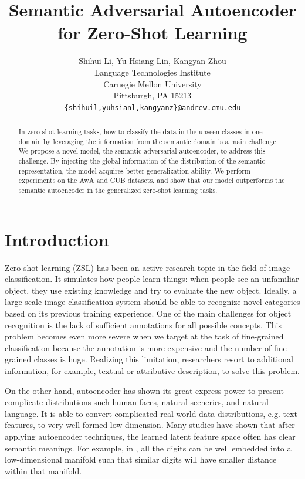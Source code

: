\documentclass{article}
\title{Semantic Adversarial Autoencoder for Zero-Shot Learning}
\author{
	Shihui Li, Yu-Hsiang Lin, Kangyan Zhou
		\\
	Language Technologies Institute\\
	Carnegie Mellon University\\
	Pittsburgh, PA 15213 \\
	\texttt{\{shihuil,yuhsianl,kangyanz\}@andrew.cmu.edu} \\
}
\begin{document}
\maketitle

\begin{abstract}

In zero-shot learning tasks, how to classify the data in the unseen classes in one domain by leveraging the information from the semantic domain is a main challenge. We propose a novel model, the semantic adversarial autoencoder, to address this challenge. By injecting the global information of the distribution of the semantic representation, the model acquires better generalization ability. We perform experiments on the AwA and CUB datasets, and show that our model outperforms the semantic autoencoder in the generalized zero-shot learning tasks.

\end{abstract}


\section{Introduction}

Zero-shot learning (ZSL) has been an active research topic in the field of image classification. It simulates how people learn things: when people see an unfamiliar object, they use existing knowledge and try to evaluate the new object. Ideally, a large-scale image classification system should be able to recognize novel categories based on its previous training experience. One of the main challenges for object recognition is the lack of sufficient annotations for all possible concepts. This problem becomes even more severe when we target at the task of fine-grained classification because the annotation is more expensive and the number of fine-grained classes is huge. Realizing this limitation, researchers resort to additional information, for example, textual or attributive description, to solve this problem.  

On the other hand, autoencoder has shown its great express power to present complicate distributions such human faces, natural sceneries, and natural language. It is able to convert complicated real world data distributions, e.g. text features, to very well-formed low dimension. Many studies have shown that after applying autoencoder techniques, the learned latent feature space often has clear semantic meanings. For example, in \cite{makhzani2015adversarial}, all the digits can be well embedded into a low-dimensional manifold such that similar digits will have smaller distance within that manifold.
\end{document}
